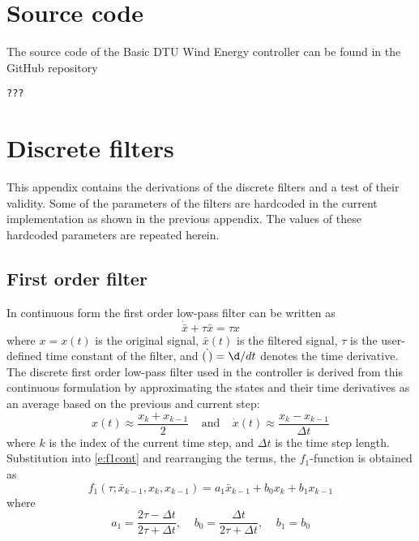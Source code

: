 \appendix
\chapter{Source code} \label{ch:source}

The source code of the Basic DTU Wind Energy controller can be found in the GitHub repository 
\begin{verbatim}???\end{verbatim}


\clearpage
\chapter{Discrete filters} \label{ch:filters}

This appendix contains the derivations of the discrete filters and a test of their validity. Some of the parameters of the filters are hardcoded in the current implementation as shown in the previous appendix. The values of these hardcoded parameters are repeated herein.

\section{First order filter}

In continuous form the first order low-pass filter can be written as
\begin{equation}\label{e:f1cont}
\dot{\bar x} + \tau \bar x = \tau x
\end{equation}
where $x=x(t)$ is the original signal, $\bar x(t)$ is the filtered signal, $\tau$ is the user-defined time constant of the filter, and $\dot{(\,)}=\d/dt$ denotes the time derivative. The discrete first order low-pass filter used in the controller is derived from this continuous formulation by approximating the states and their time derivatives as an average based on the previous and current step:
\begin{equation}\label{e:1storder}
x(t)\approx \frac{x_k+x_{k-1}}2 \;\;\;\;\mbox{and} \;\;\;\;\dot x(t)\approx \frac{x_k-x_{k-1}}{\Delta t}
\end{equation}
where $k$ is the index of the current time step, and $\Delta t$ is the time step length. Substitution into \eqref{e:f1cont} and rearranging the terms, the $f_1$-function is obtained as
\begin{equation}
\label{e:f1}
f_1 \left(\tau; \bar x_{k-1} , x_{k} , x_{k-1} \right) = a_1 \bar x_{k-1} + b_0 x_k + b_1 x_{k-1}
\end{equation}
where
\begin{equation}
\label{e:f1coef}
a_1=\frac {2\tau-\Delta t}{2\tau+\Delta t} , \;\;\;\; b_0 = \frac {\Delta t}{2\tau+\Delta t}, \;\;\;\; b_1 = b_0
\end{equation}

